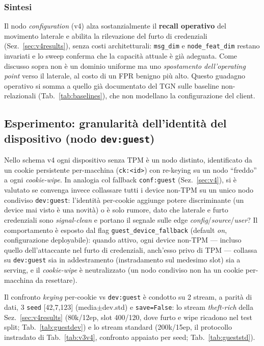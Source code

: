 \subsubsection{Sintesi}

Il nodo \textit{configuration} (v4) alza sostanzialmente il \textbf{recall operativo} del movimento laterale e abilita la rilevazione del furto di credenziali (Sez.~\ref{sec:v4results}), senza costi architetturali: \texttt{msg\_dim} e \texttt{node\_feat\_dim} restano invariati e lo sweep conferma che la capacità attuale è già adeguata. Come discusso sopra non è un dominio uniforme ma uno \textit{spostamento dell'operating point} verso il laterale, al costo di un FPR benigno più alto. Questo guadagno operativo si somma a quello già documentato del TGN sulle baseline non-relazionali (Tab.~\ref{tab:baselines}), che non modellano la configurazione del client.

\subsection{Esperimento: granularità dell'identità del dispositivo (nodo \texttt{dev:guest})}
\label{sec:guestdev}

Nello schema v4 ogni dispositivo senza TPM è un nodo distinto, identificato da un cookie persistente per-macchina (\texttt{ck:<id>}) con re-keying su un nodo ``freddo'' a ogni \textit{cookie-wipe}. In analogia col fallback \texttt{conf:guest} (Sez.~\ref{sec:v4}), si è valutato se convenga invece collassare tutti i device non-TPM su un unico nodo condiviso \texttt{dev:guest}: l'identità per-cookie aggiunge potere discriminante (un device mai visto è una novità) o è solo rumore, dato che laterale e furto credenziali sono \textit{signal-clean} e portano il segnale sulle edge \textit{config}/\textit{source}/\textit{user}? Il comportamento è esposto dal flag \texttt{guest\_device\_fallback} (default \emph{on}, configurazione deployabile): quando attivo, ogni device non-TPM --- incluso quello dell'attaccante nel furto di credenziali, anch'esso privo di TPM --- collassa su \texttt{dev:guest} sia in addestramento (instradamento sul medesimo slot) sia a serving, e il \textit{cookie-wipe} è neutralizzato (un nodo condiviso non ha un cookie per-macchina da resettare).

Il confronto \textit{keying} per-cookie vs \texttt{dev:guest} è condotto su 2 stream, a parità di dati, 3 \texttt{seed} [42,7,123] (media$\pm$dev.std) e \texttt{save=False}: lo stream \emph{theft-rich} della Sez.~\ref{sec:v4results} (80k/12ep, slot 400/120, dove furto e wipe ricadono nel test split; Tab.~\ref{tab:guestdev}) e lo stream standard (200k/15ep, il protocollo instradato di Tab.~\ref{tab:v3v4}, confronto appaiato per seed; Tab.~\ref{tab:gueststd}).

